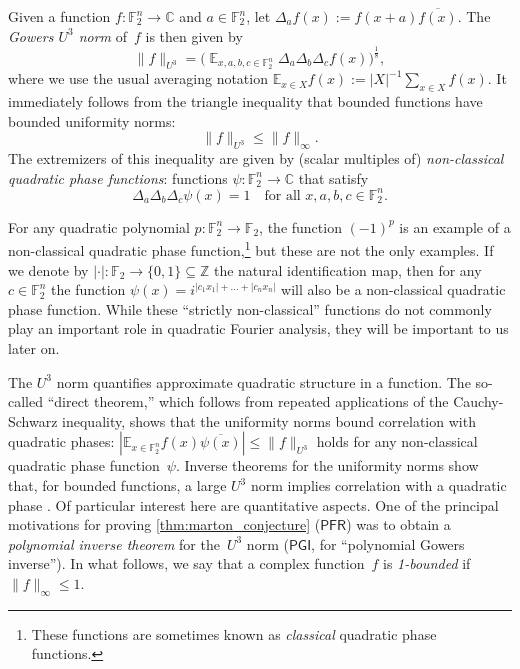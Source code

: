 \documentclass[11pt]{amsart}
\newcommand{\Exp}{\mathop{\mathbb{E}}}
\newcommand{\E}{\mathbb{E}}
\newcommand{\C}{\mathbb{C}} %
\newcommand{\Z}{\mathbb{Z}} %
\newcommand{\F}{\mathbb{F}} %
\newcommand{\PFR}{\textsf{PFR}}
\newcommand{\PGI}{\textsf{PGI}}
\theoremstyle{plain}
\theoremstyle{definition}
\theoremstyle{remark}
\begin{document}
Given a function $f:\F_2^n\to\C$ and $a\in \F_2^n$, let $\Delta_af(x) := f(x+a)\overline{f(x)}$.
The \emph{Gowers $U^3$ norm} of~$f$ is then given by
\begin{equation*}
    \|f\|_{U^3} = \big(\Exp_{x,a,b,c \in \F_2^n}\Delta_a\Delta_b\Delta_cf(x)\big)^{\frac{1}{8}},
\end{equation*}
where we use the usual averaging notation $\E_{x\in X} f(x) := |X|^{-1} \sum_{x\in X} f(x)$.
It immediately follows from the triangle inequality that bounded functions have bounded uniformity norms:
\begin{equation*}
    \|f\|_{U^3} \leq \|f\|_{\infty}.
\end{equation*}
The extremizers of this inequality are given by (scalar multiples of) \emph{non-classical quadratic phase functions}:
functions $\psi: \F_2^n \to \C$ that satisfy
\begin{equation}\label{def:ncqphase}
    \Delta_a \Delta_b \Delta_c \psi(x) = 1 \quad \text{for all $x, a, b, c\in \F_2^n$.}
\end{equation}

For any quadratic polynomial $p: \F_2^n \to \F_2$, the function $(-1)^{p}$ is an example of a non-classical quadratic phase function,\footnote{These functions are sometimes known as \emph{classical} quadratic phase functions.}
but these are not the only examples.
If we denote by $|\cdot|: \F_2 \to \{0,1\}\subseteq \Z$ the natural identification map, then for any $c\in \F_2^n$ the function $\psi(x) = i^{|c_1x_1|+\dots+|c_nx_n|}$ will also be a non-classical quadratic phase function.
While these ``strictly non-classical'' functions do not commonly play an important role in quadratic Fourier analysis, they will be important to us later on.

The $U^3$ norm quantifies approximate quadratic structure in a function.
The so-called ``direct theorem,''  which follows from repeated applications of the Cauchy-Schwarz inequality, shows that the uniformity norms bound correlation with quadratic phases:
$|\E_{x\in \F_2^n} f(x) \overline{\psi(x)}| \leq \|f\|_{U^{3}}$ holds for any non-classical quadratic phase function~$\psi$.
Inverse theorems for the uniformity norms show that, for bounded functions, a large $U^3$ norm implies correlation with a quadratic phase \cite{samorodnitsky2007low, GreenTao2008}.
Of particular interest here are quantitative aspects. 
One of the principal motivations for proving \cref{thm:marton_conjecture} ($\PFR$) was to obtain a \emph{polynomial inverse theorem} for the~$U^3$ norm ($\PGI$, for ``polynomial Gowers inverse'').
In what follows, we say that a complex function~$f$ is \emph{1-bounded} if~$\|f\|_\infty \leq 1$.
\end{document}
